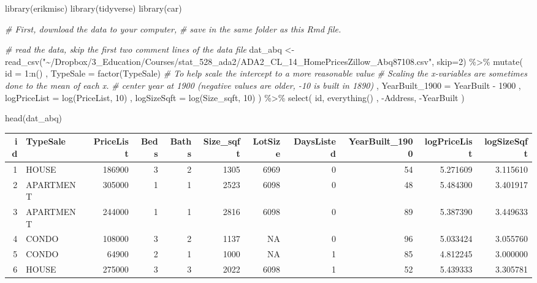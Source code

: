 \documentclass[
  12pt,
]{article}
\newenvironment{Shaded}{\begin{snugshade}}{\end{snugshade}}
\newcommand{\AttributeTok}[1]{\textcolor[rgb]{0.77,0.63,0.00}{#1}}
\newcommand{\CommentTok}[1]{\textcolor[rgb]{0.56,0.35,0.01}{\textit{#1}}}
\newcommand{\DecValTok}[1]{\textcolor[rgb]{0.00,0.00,0.81}{#1}}
\newcommand{\FunctionTok}[1]{\textcolor[rgb]{0.00,0.00,0.00}{#1}}
\newcommand{\NormalTok}[1]{#1}
\newcommand{\OtherTok}[1]{\textcolor[rgb]{0.56,0.35,0.01}{#1}}
\newcommand{\SpecialCharTok}[1]{\textcolor[rgb]{0.00,0.00,0.00}{#1}}
\newcommand{\StringTok}[1]{\textcolor[rgb]{0.31,0.60,0.02}{#1}}
\begin{document}
\begin{Shaded}
\begin{Highlighting}[]
\FunctionTok{library}\NormalTok{(erikmisc)}
\FunctionTok{library}\NormalTok{(tidyverse)}
\FunctionTok{library}\NormalTok{(car)}

\CommentTok{\# First, download the data to your computer,}
\CommentTok{\#   save in the same folder as this Rmd file.}

\CommentTok{\# read the data, skip the first two comment lines of the data file}
\NormalTok{dat\_abq }\OtherTok{\textless{}{-}}
  \FunctionTok{read\_csv}\NormalTok{(}\StringTok{"\textasciitilde{}/Dropbox/3\_Education/Courses/stat\_528\_ada2/ADA2\_CL\_14\_HomePricesZillow\_Abq87108.csv"}\NormalTok{, }\AttributeTok{skip=}\DecValTok{2}\NormalTok{) }\SpecialCharTok{\%\textgreater{}\%}
  \FunctionTok{mutate}\NormalTok{(}
    \AttributeTok{id =} \DecValTok{1}\SpecialCharTok{:}\FunctionTok{n}\NormalTok{()}
\NormalTok{  , }\AttributeTok{TypeSale =} \FunctionTok{factor}\NormalTok{(TypeSale)}
    \CommentTok{\# To help scale the intercept to a more reasonable value}
    \CommentTok{\#   Scaling the x{-}variables are sometimes done to the mean of each x.}
    \CommentTok{\# center year at 1900 (negative values are older, {-}10 is built in 1890)}
\NormalTok{  , }\AttributeTok{YearBuilt\_1900 =}\NormalTok{ YearBuilt }\SpecialCharTok{{-}} \DecValTok{1900}
\NormalTok{  , }\AttributeTok{logPriceList =} \FunctionTok{log}\NormalTok{(PriceList, }\DecValTok{10}\NormalTok{)}
\NormalTok{  , }\AttributeTok{logSizeSqft =} \FunctionTok{log}\NormalTok{(Size\_sqft, }\DecValTok{10}\NormalTok{)}
\NormalTok{  ) }\SpecialCharTok{\%\textgreater{}\%}
  \FunctionTok{select}\NormalTok{(}
\NormalTok{    id, }\FunctionTok{everything}\NormalTok{()}
\NormalTok{    , }\SpecialCharTok{{-}}\NormalTok{Address, }\SpecialCharTok{{-}}\NormalTok{YearBuilt}
\NormalTok{  )}

\FunctionTok{head}\NormalTok{(dat\_abq)}
\end{Highlighting}
\end{Shaded}

\begin{tabular}{r|l|r|r|r|r|r|r|r|r|r}
\hline
id & TypeSale & PriceList & Beds & Baths & Size\_sqft & LotSize & DaysListed & YearBuilt\_1900 & logPriceList & logSizeSqft\\
\hline
1 & HOUSE & 186900 & 3 & 2 & 1305 & 6969 & 0 & 54 & 5.271609 & 3.115610\\
\hline
2 & APARTMENT & 305000 & 1 & 1 & 2523 & 6098 & 0 & 48 & 5.484300 & 3.401917\\
\hline
3 & APARTMENT & 244000 & 1 & 1 & 2816 & 6098 & 0 & 89 & 5.387390 & 3.449633\\
\hline
4 & CONDO & 108000 & 3 & 2 & 1137 & NA & 0 & 96 & 5.033424 & 3.055760\\
\hline
5 & CONDO & 64900 & 2 & 1 & 1000 & NA & 1 & 85 & 4.812245 & 3.000000\\
\hline
6 & HOUSE & 275000 & 3 & 3 & 2022 & 6098 & 1 & 52 & 5.439333 & 3.305781\\
\hline
\end{tabular}
\end{document}
